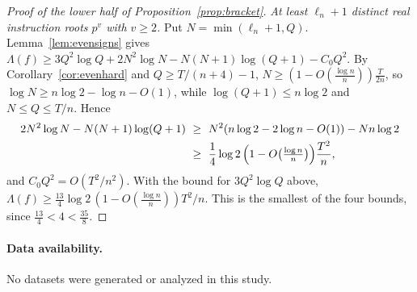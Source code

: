 \documentclass[11pt]{article}
\theoremstyle{remark}
\begin{document}
\begin{proof}[Proof of the lower half of Proposition~\ref{prop:bracket}]
\emph{At least $\ell_n+1$ distinct real instruction roots $p^v$ with $v\ge2$.}  Put
$N=\min(\ell_n+1,Q)$.  Lemma~\ref{lem:evensigns} gives
$\Lambda(f)\ge3Q^2\log Q+2N^2\log N-N(N+1)\log(Q+1)-C_0Q^2$.  By
Corollary~\ref{cor:evenhard} and $Q\ge T/(n+4)-1$,
$N\ge(1-O(\frac{\log n}n))\frac T{2n}$, so $\log N\ge n\log2-\log n-O(1)$, while
$\log(Q+1)\le n\log2$ and $N\le Q\le T/n$.  Hence
\[
  \begin{aligned}
  2N^2\log N-N(N+1)\log(Q+1)&\ \ge\ N^2(n\log2-2\log n-O(1))-Nn\log2\\
  &\ \ge\ \frac14\log2\,\Bigl(1-O\bigl(\tfrac{\log n}n\bigr)\Bigr)\frac{T^2}n ,
  \end{aligned}
\]
and $C_0Q^2=O(T^2/n^2)$.  With the bound for $3Q^2\log Q$ above,
$\Lambda(f)\ge\frac{13}4\log2\,(1-O(\frac{\log n}n))T^2/n$.  This is the smallest of the
four bounds, since $\frac{13}4<4<\frac{35}8$.
\end{proof}

\paragraph{Data availability.}
No datasets were generated or analyzed in this study.
\end{document}
